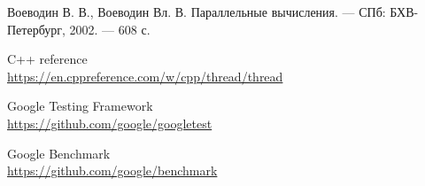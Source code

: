 


\begin{thebibliography}{8}

    Воеводин В. В., Воеводин Вл. В. Параллельные вычисления. — СПб: БХВ-Петербург, 2002. — 608 с.

    C++ reference
    \\\url{https://en.cppreference.com/w/cpp/thread/thread}

    Google Testing Framework
    \\\url{https://github.com/google/googletest}

    Google Benchmark
    \\\url{https://github.com/google/benchmark}

\end{thebibliography}